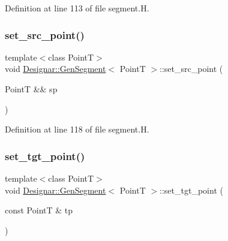 Definition at line 113 of file segment.\+H.

\mbox{\label{class_designar_1_1_gen_segment_ace3bf4ead3e970f88cacfa03b4853c3f}} 
\subsubsection{\texorpdfstring{set\+\_\+src\+\_\+point()}{set\_src\_point()}\hspace{0.1cm}{\footnotesize\ttfamily [2/2]}}
{\footnotesize\ttfamily template$<$class PointT$>$ \\
void \hyperlink{class_designar_1_1_gen_segment}{Designar\+::\+Gen\+Segment}$<$ PointT $>$\+::set\+\_\+src\+\_\+point (\begin{DoxyParamCaption}\item[{PointT \&\&}]{sp }\end{DoxyParamCaption})\hspace{0.3cm}{\ttfamily [inline]}}



Definition at line 118 of file segment.\+H.

\mbox{\label{class_designar_1_1_gen_segment_a3338743508cb033732a3c9ffd4ceb6ea}} 
\subsubsection{\texorpdfstring{set\+\_\+tgt\+\_\+point()}{set\_tgt\_point()}\hspace{0.1cm}{\footnotesize\ttfamily [1/2]}}
{\footnotesize\ttfamily template$<$class PointT$>$ \\
void \hyperlink{class_designar_1_1_gen_segment}{Designar\+::\+Gen\+Segment}$<$ PointT $>$\+::set\+\_\+tgt\+\_\+point (\begin{DoxyParamCaption}\item[{const PointT \&}]{tp }\end{DoxyParamCaption})\hspace{0.3cm}{\ttfamily [inline]}}



